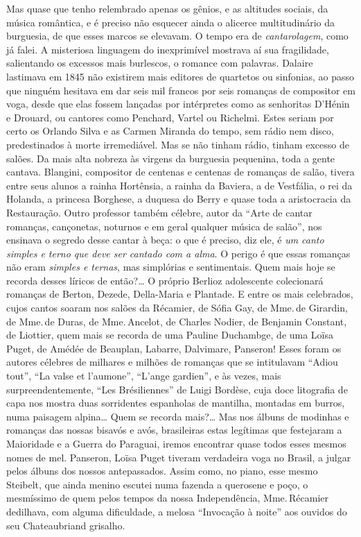 Mas quase que tenho relembrado apenas os gênios, e as altitudes sociais,
da música romântica, e é preciso não esquecer ainda o alicerce
multitudinário da burguesia, de que esses marcos se elevavam. O tempo
era de \textit{cantarolagem}, como já falei. A misteriosa linguagem do
inexprimível mostrava aí sua fragilidade, salientando os excessos mais
burlescos, o romance com palavras. Dalaire lastimava em 1845 não
existirem mais editores de quartetos ou sinfonias, ao passo que ninguém
hesitava em dar seis mil francos por seis romanças de compositor em
voga, desde que elas fossem lançadas por intérpretes como as senhoritas
D'Hénin e Drouard, ou cantores como Penchard, Vartel ou Richelmi. Estes
seriam por certo os Orlando Silva e as Carmen Miranda do tempo, sem
rádio nem disco, predestinados à morte irremediável. Mas se não tinham
rádio, tinham excesso de salões. Da mais alta nobreza às virgens da
burguesia pequenina, toda a gente cantava. Blangini, compositor de
centenas e centenas de romanças de salão, tivera entre seus alunos a
rainha Hortênsia, a rainha da Baviera, a de Vestfália, o rei da Holanda,
a princesa Borghese, a duquesa do Berry e quase toda a aristocracia da
Restauração. Outro professor também célebre, autor da ``Arte de cantar
romanças, cançonetas, noturnos e em geral qualquer música de salão'', nos
ensinava o segredo desse cantar à beça: o que é preciso, diz ele, é \textit{um
canto simples e terno que deve ser cantado com a alma}. O perigo é que
essas romanças não eram \textit{simples e ternas}, mas simplórias e
sentimentais. Quem mais hoje se recorda desses líricos de então?\ldots{} O
próprio Berlioz adolescente colecionará romanças de Berton, Dezede,
Della-Maria e Plantade. E entre os mais celebrados, cujos cantos soaram
nos salões da Récamier, de Sófia Gay, de Mme.\,de Girardin, de Mme.\,de
Duras, de Mme.\,Ancelot, de Charles Nodier, de Benjamin Constant, de
Liottier, quem mais se recorda de uma Pauline Duchambge, de uma Loïsa
Puget, de Amédée de Beauplan, Labarre, Dalvimare, Panseron! Esses foram
os autores célebres de milhares e milhões de romanças que se intitulavam
``Adiou tout'', ``La valse et l'aumone'', ``L'ange gardien'', e às
vezes, mais surpreendentemente, ``Les Brésiliennes'' de Luigi Bordèse,
cuja doce litografia de capa nos mostra duas sorridentes espanholas de
mantilha, montadas em burros, numa paisagem alpina\ldots{} Quem se recorda
mais?\ldots{} Mas nos álbuns de modinhas e romanças das nossas bisavós e
avós, brasileiras estas legítimas que festejaram a Maioridade e a Guerra
do Paraguai, iremos encontrar quase todos esses mesmos nomes de mel.
Panseron, Loïsa Puget tiveram verdadeira voga no Brasil, a julgar pelos
álbuns dos nossos antepassados. Assim como, no piano, esse mesmo
Steibelt, que ainda menino escutei numa fazenda a querosene e poço, o
mesmíssimo de quem pelos tempos da nossa Independência, Mme.\,Récamier
dedilhava, com alguma dificuldade, a melosa ``Invocação à noite'' aos
ouvidos do seu Chateaubriand grisalho.

